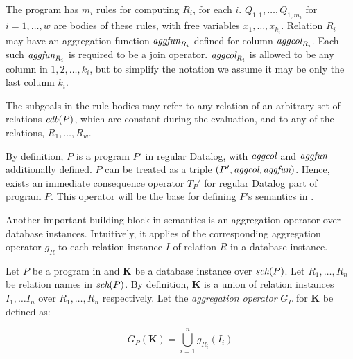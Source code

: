 
The program has $m_i$ rules for computing $R_i$, for each $i$. $Q_{1, 1}, \dots, Q_{1, m_i}$ for $i = 1, \dots, w$ are bodies of these rules, with free variables $x_1, \dots, x_{k_i}$. Relation $R_i$ may have an aggregation function $\textit{aggfun}_{R_i}$ defined for column $\textit{aggcol}_{R_i}$. Each such $\textit{aggfun}_{R_i}$ is required to be a join operator. $\textit{aggcol}_{R_i}$ is allowed to be any column in $1, 2, \dots, k_i$, but to simplify the notation we assume it may be only the last column $k_i$.

The subgoals in the rule bodies may refer to any relation of an arbitrary set of \edb relations $\textit{edb}(P)$, which are constant during the evaluation, and to any of the \idb relations, $R_1, \dots, R_w$.

By definition, $P$ is a program $P'$ in regular Datalog, with $\textit{aggcol}$ and $\textit{aggfun}$ additionally defined. $P$ can be treated as a triple $(P', \textit{aggcol}, \textit{aggfun})$. Hence, exists an immediate consequence operator $T_P'$ for regular Datalog part of program $P$. This operator will be the base for defining $P$'s semantics in \datalogra.


Another important building block in \datalogra semantics is an aggregation operator over database instances. Intuitively, it applies of the corresponding aggregation operator $g_R$ to each relation instance $I$ of relation $R$ in a database instance.

\begin{defn}
Let $P$ be a program in \datalogra and $\textbf{K}$ be a database instance over $\textit{sch}(P)$. Let $R_1, \dots, R_n$ be relation names in $\textit{sch}(P)$. By definition, $\textbf{K}$ is a union of relation instances $I_1, \dots I_n$ over $R_1, \dots, R_n$ respectively. %
Let the \emph{aggregation operator} $G_P$ for $\textbf{K}$ be defined as:

$$G_P(\textbf{K}) = \bigcup_{i = 1}^n g_{R_i}(I_i)$$

\end{defn}

